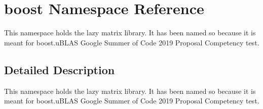 \hypertarget{namespaceboost}{}\section{boost Namespace Reference}
\label{namespaceboost}


This namespace holds the lazy matrix library. It has been named so because it is meant for boost.\+u\+B\+L\+AS Google Summer of Code 2019 Proposal Competency test.  




\subsection{Detailed Description}
This namespace holds the lazy matrix library. It has been named so because it is meant for boost.\+u\+B\+L\+AS Google Summer of Code 2019 Proposal Competency test. 

